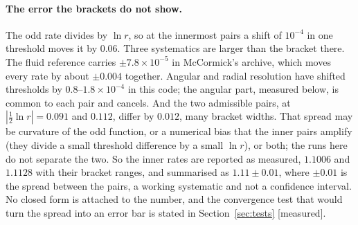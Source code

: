 \documentclass[11pt]{article}
\newcommand{\grade}[1]{\textsf{\small[#1]}}
\begin{document}
\paragraph{The error the brackets do not show.} The odd rate divides by $\ln r$, so at the innermost pairs a shift of $10^{-4}$ in one threshold moves it by $0.06$. Three systematics are larger than the bracket there. The fluid reference carries $\pm7.8\times10^{-5}$ in McCormick's archive, which moves every rate by about $\pm0.004$ together. Angular and radial resolution have shifted thresholds by $0.8$--$1.8\times10^{-4}$ in this code; the angular part, measured below, is common to each pair and cancels. And the two admissible pairs, at $|\tfrac12\ln r|=0.091$ and $0.112$, differ by $0.012$, many bracket widths. That spread may be curvature of the odd function, or a numerical bias that the inner pairs amplify (they divide a small threshold difference by a small $\ln r$), or both; the runs here do not separate the two. So the inner rates are reported as measured, $1.1006$ and $1.1128$ with their bracket ranges, and summarised as $1.11\pm0.01$, where $\pm0.01$ is the spread between the pairs, a working systematic and not a confidence interval. No closed form is attached to the number, and the convergence test that would turn the spread into an error bar is stated in Section~\ref{sec:tests} \grade{measured}.
\end{document}
